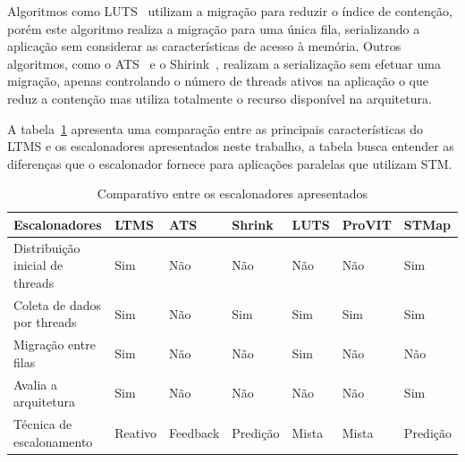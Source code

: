 \documentclass[diss,capa]{texufpel}
\begin{document}
Algoritmos como LUTS~\cite{Nicacio2012} utilizam a migração para reduzir o índice de contenção, porém este algoritmo realiza a migração para uma única fila, serializando a aplicação sem considerar as características de acesso à memória. Outros algoritmos, como o ATS~\cite{ats2008} e o Shirink~\cite{shirink2009}, realizam a serialização sem efetuar uma migração, apenas controlando o número de threads ativos na aplicação o que reduz a contenção mas utiliza totalmente o recurso disponível na arquitetura.

A tabela~\ref{tab:compare_ltms} apresenta uma comparação entre as principais características do LTMS e os escalonadores apresentados neste trabalho, a tabela busca entender as diferenças que o escalonador fornece para aplicações paralelas que utilizam STM.

\begin{table}[]
 \footnotesize
 \centering
 \caption{Comparativo entre os escalonadores apresentados}
 \label{tab:compare_ltms}
 \begin{tabular}{l|l|l|l|l|l|l}
 \hline
 Escalonadores & LTMS & ATS & Shrink & LUTS & ProVIT & STMap \\ \hline %
 Distribuição inicial de threads & Sim & Não & Não & Não & Não & Sim \\
 Coleta de dados por threads & Sim & Não & Sim & Sim & Sim & Sim \\
 Migração entre filas & Sim & Não & Não & Sim & Não & Não \\
 Avalia a arquitetura  & Sim & Não & Não & Não & Não & Sim \\
 Técnica de escalonamento & Reativo & Feedback & Predição & Mista & Mista & Predição \\
 \hline
 \end{tabular}
\end{table}



\end{document}
